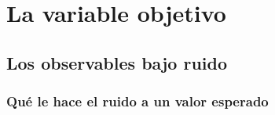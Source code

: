 \chapter{La variable objetivo}
\label{cap:variable}


%


\section{Los observables bajo ruido}
\label{sec:observables_ruido}
%
%

\subsection{Qué le hace el ruido a un valor esperado}

